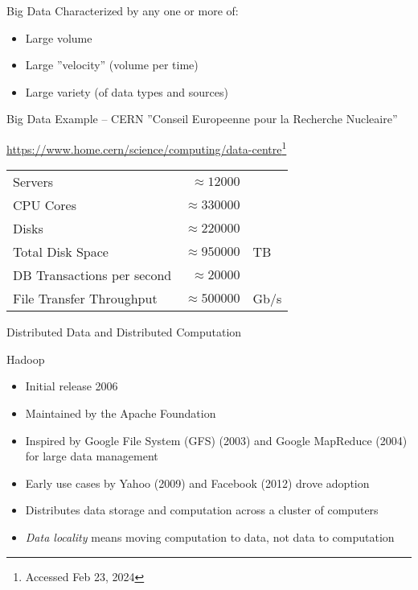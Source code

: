 \documentclass[ignorenonframetext,xcolor=x11names]{beamer}
\begin{document}
\begin{frame}{Big Data}
Characterized by any one or more of:
\begin{itemize}
    \item Large volume
    \item Large ''velocity'' (volume per time)
    \item Large variety (of data types and sources)
\end{itemize}
\end{frame}

\begin{frame}{Big Data Example -- CERN}
\small
''Conseil Europeenne pour la Recherche Nucleaire''

\footnotesize\url{https://www.home.cern/science/computing/data-centre}\footnote{Accessed Feb 23, 2024}\small
\begin{center}
\renewcommand{\arraystretch}{1.5}
\begin{tabular}{l r l} \hline
Servers & $\approx 12000$ \\
CPU Cores & $\approx 330000$ \\
Disks & $\approx 220000$ \\
Total Disk Space & $\approx 950000$ & TB \\ 
DB Transactions per second & $\approx 20000$ \\ 
File Transfer Throughput & $\approx 500000$ & Gb/s\\  \hline
\end{tabular}
\end{center}
\end{frame}

\begin{frame}{Distributed Data and Distributed Computation}
\begin{block}{Hadoop}
\begin{itemize}
   \item Initial release 2006
   \item Maintained by the Apache Foundation
   \item Inspired by Google File System (GFS) (2003) and Google MapReduce (2004) for large data management
   \item Early use cases by Yahoo (2009) and Facebook (2012) drove adoption
   \item Distributes data storage and computation across a cluster of computers
   \item \emph{Data locality} means moving computation to data, not data to computation
\end{itemize}
\end{block}
\end{frame}
\end{document}
